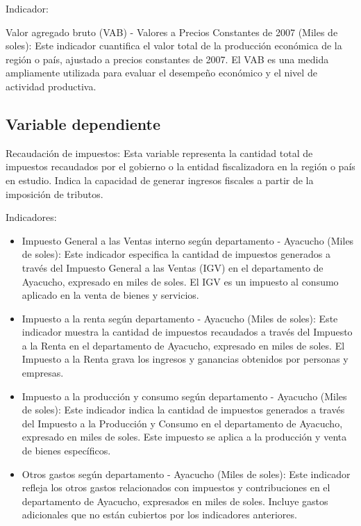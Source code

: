 \documentclass[
  letterpaper,
  DIV=11,
  numbers=noendperiod]{scrartcl}
\begin{document}
Indicador:

Valor agregado bruto (VAB) - Valores a Precios Constantes de 2007 (Miles
de soles): Este indicador cuantifica el valor total de la producción
económica de la región o país, ajustado a precios constantes de 2007. El
VAB es una medida ampliamente utilizada para evaluar el desempeño
económico y el nivel de actividad productiva.

\hypertarget{sec-variable-dependiente}{%
\subsection{Variable dependiente}\label{sec-variable-dependiente}}

Recaudación de impuestos: Esta variable representa la cantidad total de
impuestos recaudados por el gobierno o la entidad fiscalizadora en la
región o país en estudio. Indica la capacidad de generar ingresos
fiscales a partir de la imposición de tributos.

Indicadores:

\begin{itemize}
\item
  Impuesto General a las Ventas interno según departamento - Ayacucho
  (Miles de soles): Este indicador especifica la cantidad de impuestos
  generados a través del Impuesto General a las Ventas (IGV) en el
  departamento de Ayacucho, expresado en miles de soles. El IGV es un
  impuesto al consumo aplicado en la venta de bienes y servicios.
\item
  Impuesto a la renta según departamento - Ayacucho (Miles de soles):
  Este indicador muestra la cantidad de impuestos recaudados a través
  del Impuesto a la Renta en el departamento de Ayacucho, expresado en
  miles de soles. El Impuesto a la Renta grava los ingresos y ganancias
  obtenidos por personas y empresas.
\item
  Impuesto a la producción y consumo según departamento - Ayacucho
  (Miles de soles): Este indicador indica la cantidad de impuestos
  generados a través del Impuesto a la Producción y Consumo en el
  departamento de Ayacucho, expresado en miles de soles. Este impuesto
  se aplica a la producción y venta de bienes específicos.
\item
  Otros gastos según departamento - Ayacucho (Miles de soles): Este
  indicador refleja los otros gastos relacionados con impuestos y
  contribuciones en el departamento de Ayacucho, expresados en miles de
  soles. Incluye gastos adicionales que no están cubiertos por los
  indicadores anteriores.
\end{itemize}
\end{document}
